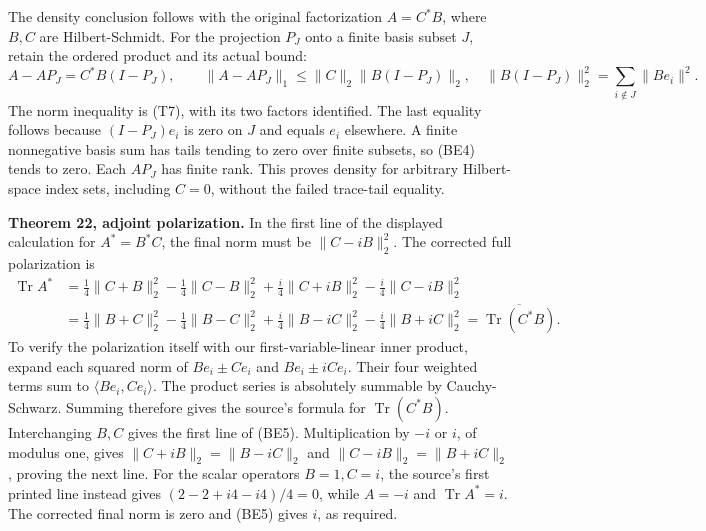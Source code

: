 \documentclass[
  11pt,
]{article}
\begin{document}
The density conclusion follows with the original factorization
\(A=C^*B\), where \(B,C\) are Hilbert-Schmidt. For the projection
\(P_J\) onto a finite basis subset \(J\), retain the ordered product and
its actual bound: \[
 A-AP_J=C^*B(I-P_J),\qquad
 \|A-AP_J\|_1\leq\|C\|_2\|B(I-P_J)\|_2,
 \quad\|B(I-P_J)\|_2^2=\sum_{i\notin J}\|Be_i\|^2.
 \tag{BE4}
\] The norm inequality is (T7), with its two factors identified. The
last equality follows because \((I-P_J)e_i\) is zero on \(J\) and equals
\(e_i\) elsewhere. A finite nonnegative basis sum has tails tending to
zero over finite subsets, so (BE4) tends to zero. Each \(AP_J\) has
finite rank. This proves density for arbitrary Hilbert-space index sets,
including \(C=0\), without the failed trace-tail equality.

\textbf{Theorem 22, adjoint polarization.} In the first line of the
displayed calculation for \(A^*=B^*C\), the final norm must be
\(\|C-iB\|_2^2\). The corrected full polarization is \[
 \begin{split}
 \operatorname{Tr}A^*
 &=\tfrac14\|C+B\|_2^2-\tfrac14\|C-B\|_2^2
       +\tfrac i4\|C+iB\|_2^2-\tfrac i4\|C-iB\|_2^2\\
 &=\tfrac14\|B+C\|_2^2-\tfrac14\|B-C\|_2^2
       +\tfrac i4\|B-iC\|_2^2-\tfrac i4\|B+iC\|_2^2
 =\overline{\operatorname{Tr}(C^*B)}.
 \end{split}
 \tag{BE5}
\] To verify the polarization itself with our first-variable-linear
inner product, expand each squared norm of \(Be_i\pm Ce_i\) and
\(Be_i\pm iCe_i\). Their four weighted terms sum to
\(\langle Be_i,Ce_i\rangle\). The product series is absolutely summable
by Cauchy-Schwarz. Summing therefore gives the source's formula for
\(\operatorname{Tr}(C^*B)\). Interchanging \(B,C\) gives the first line
of (BE5). Multiplication by \(-i\) or \(i\), of modulus one, gives
\(\|C+iB\|_2=\|B-iC\|_2\) and \(\|C-iB\|_2=\|B+iC\|_2\), proving the
next line. For the scalar operators \(B=1,C=i\), the source's first
printed line instead gives \((2-2+i4-i4)/4=0\), while \(A=-i\) and
\(\operatorname{Tr}A^*=i\). The corrected final norm is zero and (BE5)
gives \(i\), as required.
\end{document}
